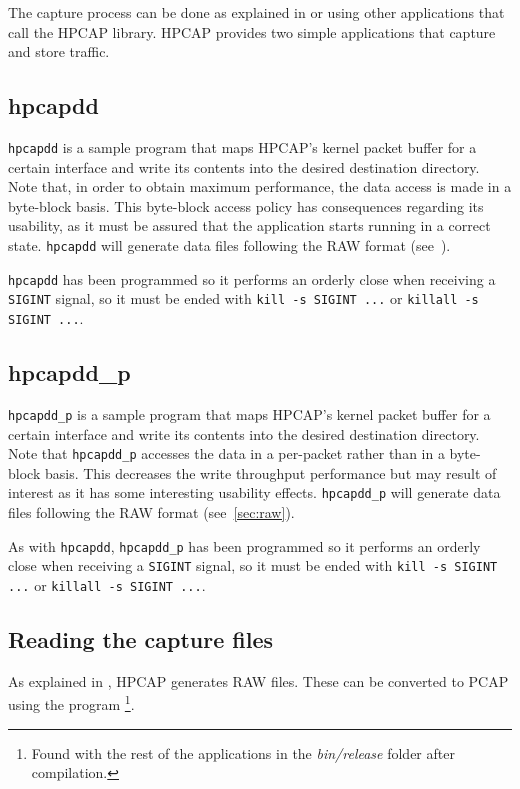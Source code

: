 \documentclass[a4paper,oneside]{hpman}
\begin{document}
The capture process can be done as explained in  or using other applications that call the HPCAP library. HPCAP provides two simple applications that capture and store traffic.

\subsection{hpcapdd}
\label{sec:hpcapdd}

\texttt{hpcapdd} is a sample program that maps HPCAP's kernel packet buffer for a certain interface and write its contents into the desired destination directory.
Note that, in order to obtain maximum performance, the data access is made in a byte-block basis. This byte-block access policy has consequences regarding its usability, as it must be assured that the application starts running in a correct state.
\texttt{hpcapdd} will generate data files following the RAW format (see~).

\texttt{hpcapdd} has been programmed so it performs an orderly close when receiving a \texttt{SIGINT} signal, so it must be ended with \texttt{kill -s SIGINT ...} or \texttt{killall -s SIGINT ...}.

\subsection{hpcapdd\_p}
\label{sec:hpcapddp}

\texttt{hpcapdd\_p} is a sample program that maps HPCAP's kernel packet buffer for a certain interface and write its contents into the desired destination directory.
Note that \texttt{hpcapdd\_p} accesses the data in a per-packet rather than in a byte-block basis. This decreases the write throughput performance but may result of interest as it has some interesting usability effects.
\texttt{hpcapdd\_p} will generate data files following the RAW format (see~\ref{sec:raw}).

As with \texttt{hpcapdd}, \texttt{hpcapdd\_p} has been programmed so it performs an orderly close when receiving a \texttt{SIGINT} signal, so it must be ended with \texttt{kill -s SIGINT ...} or \texttt{killall -s SIGINT ...}.

\subsection{Reading the capture files}
\label{sec:CaptureFiles}

As explained in , HPCAP generates RAW files. These can be converted to PCAP using the program \footnote{Found with the rest of the applications in the \textit{bin/release} folder after compilation.}.
\end{document}
